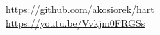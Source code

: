 \vspace{0.5\baselineskip}
{\large \faGithub\ \url{https://github.com/akosiorek/hart} \\ \faYoutube\ \url{https://youtu.be/Vvkjm0FRGSs}}